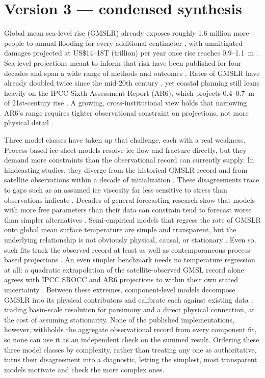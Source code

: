 \documentclass[12pt]{article}
\begin{document}
\section*{Version 3 --- condensed synthesis}

Global mean sea-level rise (GMSLR) already exposes roughly 1.6 million
more people to annual flooding for every additional centimeter
\citep{Kulp2019}, with unmitigated damages projected at US\$14--18T
(trillion) per year once rise reaches 0.9--1.1~m \citep{Jevrejeva2018}.
Sea-level projections meant to inform that risk have been published for
four decades and span a wide range of methods and outcomes
\citep{Garner2026}. Rates of GMSLR have already doubled twice since the
mid-20th century \citep{Frederikse2020,Hamlington2024}, yet coastal
planning still leans heavily on the IPCC Sixth Assessment Report (AR6),
which projects 0.4--0.7~m of 21st-century rise
\citep{Fox-Kemper2021,Hirschfeld2023}. A growing, cross-institutional view
holds that narrowing AR6's range requires tighter observational
constraint on projections, not more physical detail \citep{Felikson2025}.

Three model classes have taken up that challenge, each with a real
weakness. Process-based ice-sheet models resolve ice flow and
fracture directly, but they demand more constraints than the
observational record can currently supply. In hindcasting studies, they
diverge from the historical GMSLR record \citep{Aschwanden2021} and from
satellite observations within a decade of initialization
\citep{Fricker2025}. These disagreements trace to gaps such as an
assumed ice viscosity far less sensitive to stress than observations
indicate \citep{Millstein2022,GetraerMorlighem2025}. Decades of general
forecasting research show that models with more free parameters than
their data can constrain tend to forecast worse than simpler alternatives
\citep{Green2015,Makridakis2020}. Semi-empirical models that regress the
rate of GMSLR onto global mean surface temperature are simple and
transparent, but the underlying relationship is not obviously physical,
causal, or stationary \citep{Rahmstorf2007,Vermeer2009,Church2013}. Even
so, such fits track the observed record at least as well as
contemporaneous process-based projections \citep{Rahmstorf2012}. An even
simpler benchmark needs no temperature regression at all: a quadratic
extrapolation of the satellite-observed GMSL record alone agrees with
IPCC SROCC and AR6 projections to within their own stated uncertainty
\citep{Nerem2022}. Between
these extremes, component-level models decompose GMSLR into its physical
contributors and calibrate each against existing data
\citep{Kopp2014,Mengel2016,Wong2017}, trading basin-scale resolution for
parsimony and a direct physical connection, at the cost of assuming
stationarity. None of the published implementations, however, withholds
the aggregate observational record from every component fit, so none can
use it as an independent check on the summed result. Ordering these
three model classes by complexity, rather than treating any one as
authoritative, turns their disagreement into a diagnostic, letting the
simplest, most transparent models motivate and check the more complex
ones.
\end{document}
